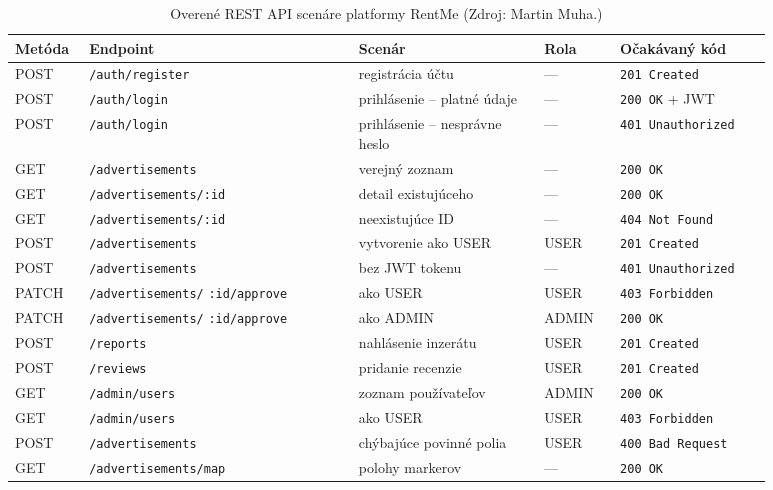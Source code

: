 \documentclass[12pt]{article}
\begin{document}
\begin{table}[htbp]
\centering
\begingroup
\scriptsize
\setlength{\tabcolsep}{5pt}
\renewcommand{\arraystretch}{1.35}
\begin{tabular}{@{}>{\raggedright\arraybackslash}p{0.07\linewidth}>{\raggedright\arraybackslash}p{0.32\linewidth}>{\raggedright\arraybackslash}p{0.22\linewidth}>{\raggedright\arraybackslash}p{0.09\linewidth}>{\raggedright\arraybackslash}p{0.18\linewidth}@{}}
\toprule
\rowcolor{gray!14}
\textbf{Metóda} & \textbf{Endpoint} & \textbf{Scenár} & \textbf{Rola} & \textbf{Očakávaný kód} \\
\midrule
POST  & \texttt{/auth/register}              & registrácia účtu                & ---   & \texttt{201 Created} \\
POST  & \texttt{/auth/login}                 & prihlásenie -- platné údaje     & ---   & \texttt{200 OK} + JWT \\
POST  & \texttt{/auth/login}                 & prihlásenie -- nesprávne heslo  & ---   & \texttt{401 Unauthorized} \\
GET   & \texttt{/advertisements}             & verejný zoznam                  & ---   & \texttt{200 OK} \\
GET   & \texttt{/advertisements/:id}         & detail existujúceho             & ---   & \texttt{200 OK} \\
GET   & \texttt{/advertisements/:id}         & neexistujúce ID                 & ---   & \texttt{404 Not Found} \\
POST  & \texttt{/advertisements}             & vytvorenie ako USER             & USER  & \texttt{201 Created} \\
POST  & \texttt{/advertisements}             & bez JWT tokenu                  & ---   & \texttt{401 Unauthorized} \\
PATCH & \texttt{/advertisements/} \texttt{:id/approve} & ako USER                  & USER  & \texttt{403 Forbidden} \\
PATCH & \texttt{/advertisements/} \texttt{:id/approve} & ako ADMIN                 & ADMIN & \texttt{200 OK} \\
POST  & \texttt{/reports}                    & nahlásenie inzerátu             & USER  & \texttt{201 Created} \\
POST  & \texttt{/reviews}                    & pridanie recenzie               & USER  & \texttt{201 Created} \\
GET   & \texttt{/admin/users}                & zoznam používateľov             & ADMIN & \texttt{200 OK} \\
GET   & \texttt{/admin/users}                & ako USER                        & USER  & \texttt{403 Forbidden} \\
POST  & \texttt{/advertisements}             & chýbajúce povinné polia         & USER  & \texttt{400 Bad Request} \\
GET   & \texttt{/advertisements/map}         & polohy markerov                 & ---   & \texttt{200 OK} \\
\bottomrule
\end{tabular}
\endgroup
\caption{Overené REST API scenáre platformy RentMe (Zdroj: Martin Muha.)}
\label{tab:rest-scenarios}
\end{table}
\end{document}
